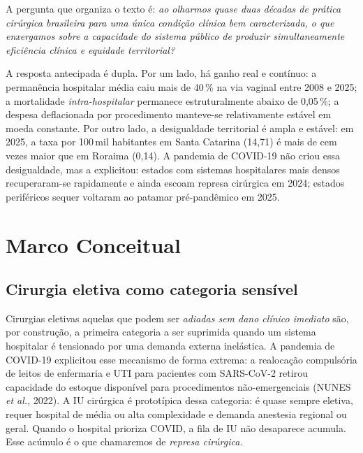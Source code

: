 \documentclass[12pt,a4paper,oneside]{article}
\begin{document}
A pergunta que organiza o texto é: \textit{ao olharmos quase duas
décadas de prática cirúrgica brasileira para uma única condição
clínica bem caracterizada, o que enxergamos sobre a capacidade
do sistema público de produzir simultaneamente eficiência clínica
e equidade territorial?}

A resposta antecipada é dupla. Por um lado, há ganho real e
contínuo: a permanência hospitalar média caiu mais de 40\,\% na
via vaginal entre 2008 e 2025; a mortalidade \textit{intra-hospitalar}
permanece estruturalmente abaixo de 0{,}05\,\%; a despesa
deflacionada por procedimento manteve-se relativamente estável
em moeda constante. Por outro lado, a desigualdade territorial é
ampla e estável: em 2025, a taxa por 100\,mil habitantes em Santa
Catarina (14{,}71) é mais de cem vezes maior que em Roraima
(0{,}14). A pandemia de COVID-19 não criou essa desigualdade,
mas a explicitou: estados com sistemas hospitalares mais densos
recuperaram-se rapidamente e ainda escoam represa cirúrgica em
2024; estados periféricos sequer voltaram ao
patamar pré-pandêmico em 2025.

\section{Marco Conceitual}\label{sec:teoria}

\subsection{Cirurgia eletiva como categoria sensível}

Cirurgias eletivas \textemdash{} aquelas que podem ser
\textit{adiadas sem dano clínico imediato} \textemdash{}
são, por construção, a primeira categoria a ser suprimida quando
um sistema hospitalar é tensionado por uma demanda externa
inelástica. A pandemia de COVID-19 explicitou esse mecanismo de
forma extrema: a realocação compulsória de leitos de enfermaria
e UTI para pacientes com SARS-CoV-2 retirou capacidade do estoque
disponível para procedimentos não-emergenciais (NUNES \textit{et
al.}, 2022). A IU cirúrgica é prototípica dessa categoria: é
quase sempre eletiva, requer hospital de média ou alta
complexidade e demanda anestesia regional ou geral. Quando o
hospital prioriza COVID, a fila de IU não desaparece \textemdash{}
acumula. Esse acúmulo é o que chamaremos de \textit{represa
cirúrgica}.
\end{document}
